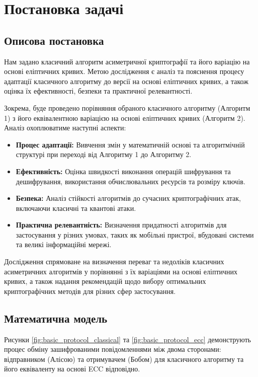 \documentclass[12pt]{report}
\theoremstyle{definition}
\theoremstyle{plain}
\begin{document}
\chapter{Постановка задачі}

\section{Описова постановка}

Нам задано класичний алгоритм асиметричної криптографії та його варіацію на основі еліптичних кривих. Метою дослідження є аналіз та пояснення процесу адаптації класичного алгоритму до версії на основі еліптичних кривих, а також оцінка їх ефективності, безпеки та практичної релевантності.

Зокрема, буде проведено порівняння обраного класичного алгоритму (Алгоритм 1) з його еквівалентною варіацією на основі еліптичних кривих (Алгоритм 2). Аналіз охоплюватиме наступні аспекти:
\begin{itemize}
    \item \textbf{Процес адаптації:} Вивчення змін у математичній основі та алгоритмічній структурі при переході від Алгоритму 1 до Алгоритму 2.
    \item \textbf{Ефективність:} Оцінка швидкості виконання операцій шифрування та дешифрування, використання обчислювальних ресурсів та розміру ключів.
    \item \textbf{Безпека:} Аналіз стійкості алгоритмів до сучасних криптографічних атак, включаючи класичні та квантові атаки.
    \item \textbf{Практична релевантність:} Визначення придатності алгоритмів для застосування у різних умовах, таких як мобільні пристрої, вбудовані системи та великі інформаційні мережі.
\end{itemize}

Дослідження спрямоване на визначення переваг та недоліків класичних асиметричних алгоритмів у порівнянні з їх варіаціями на основі еліптичних кривих, а також надання рекомендацій щодо вибору оптимальних криптографічних методів для різних сфер застосування.

\section{Математична модель}

Рисунки \ref{fig:basic_protocol_classical} та \ref{fig:basic_protocol_ecc} демонструють процес обміну зашифрованими повідомленнями між двома сторонами: відправником (Алісою) та отримувачем (Бобом) для класичного алгоритму та його еквіваленту на основі ECC відповідно.
\end{document}
